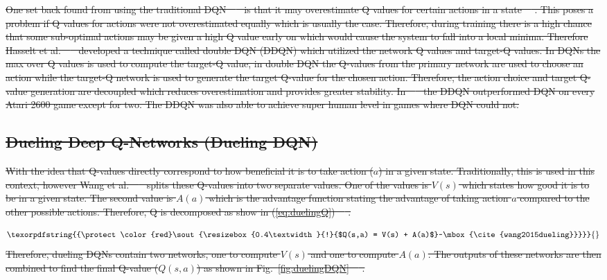 \documentclass[12pt,american]{report}
\providecommand{\DIFdeltex}[1]{{\protect\color{red}\sout{#1}}}                      %
\providecommand{\DIFdel}[1]{\texorpdfstring{\DIFdeltex{#1}}{}} %
\begin{document}
\DIFdel{One set back found from using the traditional DQN~\mbox{%
\cite{atari} }%
is that it may overestimate Q values for certain actions in a state~\mbox{%
\cite{van2016deep}}%
. This poses a problem if Q values for actions were not overestimated equally which is usually the case.  Therefore, during training there is a high chance that some sub-optimal actions may be given a high Q value early on which would cause the system to fall into a local minima.  Therefore Hasselt et al.~\mbox{%
\cite{van2016deep} }%
developed a technique called double DQN (DDQN) which utilized the network Q values and target-Q values.  In DQNs the max over Q values is used to compute the target-Q value, in double DQN the Q-values from the primary network are used to choose an action while the target-Q network is used to generate the target Q-value for the chosen action. Therefore, the action choice and target Q-value generation are decoupled which reduces overestimation and provides greater stability.  In~\mbox{%
\cite{van2016deep}  }%
the DDQN outperformed DQN on every Atari 2600 game except for two. The DDQN was also able to achieve super human level in games where DQN could not. 
}%

\subsection{\DIFdel{Dueling Deep Q-Networks (Dueling DQN)}}
\addtocounter{subsection}{-1}%
\DIFdel{With the idea that Q-values directly correspond to how beneficial it is to take action ($a$) in a given state. Traditionally, this is used in this context, however Wang et al.~\mbox{%
\cite{wang2015dueling} }%
splits these Q-values into two separate values.  One of the values is $V(s)$ which states how good it is to be in a given state. The second value is $A(a)$ which is the advantage function stating the advantage of taking action $a$ compared to the other possible actions.  Therefore, Q is decomposed as show in (\ref{eq:duelingQ})~\mbox{%
\cite{wang2015dueling}}%
.
}%

\begin{displaymath}
          \DIFdel{%
          \resizebox{0.4\textwidth}{!}{$Q(s,a) = V(s) + A(a)$}~\mbox{%
\cite{wang2015dueling}}%
}\end{displaymath}
\DIFdel{Therefore, dueling DQNs contain two networks, one to compute $V(s)$ and one to compute $A(a)$.  The outputs of these networks are then combined to find the final Q-value ($Q(s,a)$) as shown in Fig.~\ref{fig:duelingDQN}~\mbox{%
\cite{wang2015dueling}}%
.
}%
\end{document}
